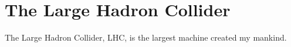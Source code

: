 \vspace{-3pt}
\section{The Large Hadron Collider}\label{sec:ch2:lhc}

The Large Hadron Collider, LHC, is the largest machine created my mankind.



